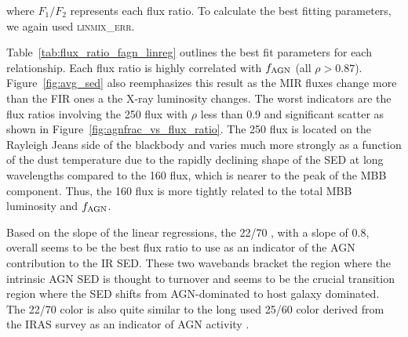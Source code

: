 \documentclass[fleqn, usenatbib]{mnras}
\begin{document}
\noindent where $F_{1}/F_{2}$ represents each flux ratio. To calculate the best fitting parameters, we again used \textsc{linmix\_err}. 

Table~\ref{tab:flux_ratio_fagn_linreg} outlines the best fit parameters for each relationship. Each flux ratio is highly correlated with $f_{\rm AGN}$ (all $\rho > 0.87$). Figure~\ref{fig:avg_sed} also reemphasizes this result as the MIR fluxes change more than the FIR ones a the X-ray luminosity changes. The worst indicators are the flux ratios involving the 250 \micron{} flux with $\rho$ less than 0.9 and significant scatter as shown in Figure~\ref{fig:agnfrac_vs_flux_ratio}. The 250 \micron{} flux is located on the Rayleigh Jeans side of the blackbody and varies much more strongly as a function of the dust temperature due to the rapidly declining shape of the SED at long wavelengths compared to the 160 \micron{} flux, which is nearer to the peak of the MBB component. Thus, the 160 \micron{} flux is more tightly related to the total MBB luminosity and $f_{\rm AGN}$.

Based on the slope of the linear regressions, the 22/70 \micron{}, with a slope of 0.8, overall seems to be the best flux ratio to use as an indicator of the AGN contribution to the IR SED. These two wavebands bracket the region where the intrinsic AGN SED is thought to turnover \citep[e.g.][]{Netzer:2007ve, Mullaney:2011yq} and seems to be the crucial transition region where the SED shifts from AGN-dominated to host galaxy dominated. The 22/70 \micron{} color is also quite similar to the long used 25/60 \micron{} color derived from the IRAS survey as an indicator of AGN activity \citep{de-Grijp:1985lr,de-Grijp:1987gb}. 

\end{document}
